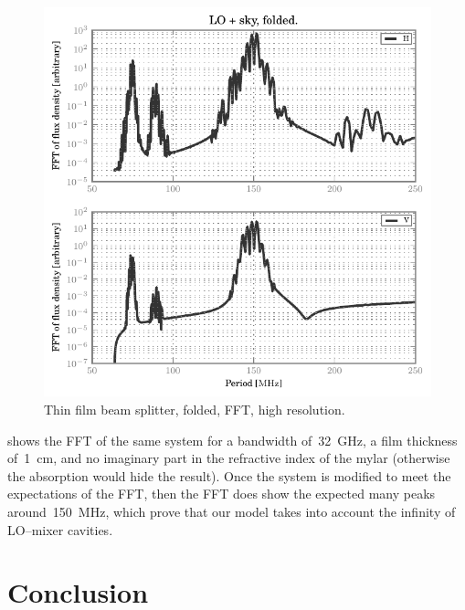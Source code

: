 \begin{figure}[hbtp]
    \centering
    \includegraphics{thin_film_beam_splitter_folded_fft_hr}
    \caption{Thin film beam splitter, folded, FFT, high resolution.}
    \label{fig:thin_film_beam_splitter_folded_fft_hr}
\end{figure}
 shows the FFT of the same system for a bandwidth of~\SI{32}{\giga\hertz}, a film thickness of~\SI{1}{\centi\meter}, and no imaginary part in the refractive index of the mylar (otherwise the absorption would hide the result).
Once the system is modified to meet the expectations of the FFT, then the FFT does show the expected many peaks around~\SI{150}{\mega\hertz}, which prove that our model takes into account the infinity of LO--mixer cavities.



\section{Conclusion}

